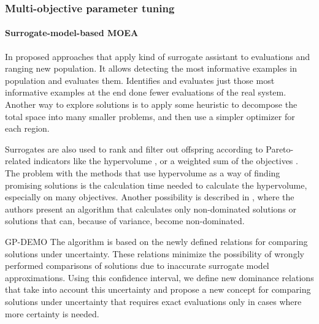         \subsubsection{Multi-objective parameter tuning}
        
            \paragraph{Surrogate-model-based MOEA}
            In \cite{KrallMD15} proposed approaches that apply kind of surrogate assistant to evaluations and ranging new population. It allows detecting the most informative examples in population and evaluates them. 
            Identifies and evaluates just those most informative examples at the end done fewer evaluations of the real system. Another way to explore solutions is to apply some heuristic to decompose the total space into many smaller problems, and then use a simpler optimizer for each region. 

            Surrogates are also used to rank and filter out offspring according to Pareto-related indicators like the hypervolume \cite{EmmerichGN06}, or a weighted sum of the objectives \cite{TaboadaBCW07}. The problem with the methods that use hypervolume as a way of finding promising solutions is the calculation time needed to calculate the hypervolume, especially on many objectives. Another possibility is described in \cite{Li2009}, where the authors present an algorithm that calculates only non-dominated solutions or solutions that can, because of variance, become non-dominated. 
            
            GP-DEMO \cite{MlakarPTF15} The algorithm is based on the newly defined relations for comparing solutions under uncertainty. These relations minimize the possibility of wrongly performed comparisons of solutions due to inaccurate 
            surrogate model approximations. Using this confidence interval, we define new dominance relations that take into account 
            this uncertainty and propose a new concept for comparing solutions under uncertainty that requires exact evaluations 
            only in cases where more certainty is needed.


